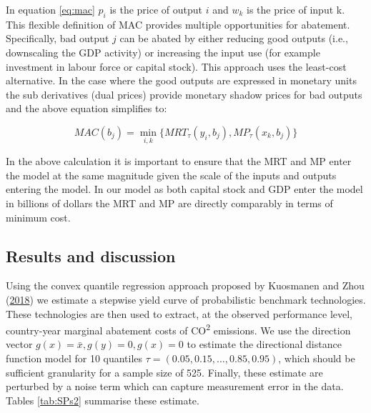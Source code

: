 \documentclass[12pt,]{article}
\begin{document}
In equation \eqref{eq:mac} \(p_{i}\) is the price of output \(i\) and \(w_{k}\) is the price of input k. This flexible definition of MAC provides multiple opportunities for abatement. Specifically, bad output \(j\) can be abated by either reducing good outputs (i.e., downscaling the GDP activity) or increasing the input use (for example investment in labour force or capital stock). This approach uses the least-cost alternative. In the case where the good outputs are expressed in monetary units the sub derivatives (dual prices) provide monetary shadow prices for bad outputs and the above equation simplifies to:

\begin{equation}
MAC(b_{j})=\displaystyle \min_{i,k}\{MRT_{\tau}(y_{i},b_{j}), MP_{\tau}(x_{k},b_{j})\} 
\label{eq:mac1}
\end{equation}

In the above calculation it is important to ensure that the MRT and MP enter the model at the same magnitude given the scale of the inputs and outputs entering the model. In our model as both capital stock and GDP enter the model in billions of dollars the MRT and MP are directly comparably in terms of minimum cost.

\hypertarget{results-and-discussion}{%
\subsection{Results and discussion}\label{results-and-discussion}}

Using the convex quantile regression approach proposed by Kuosmanen and Zhou (\protect\hyperlink{ref-Kuosmanen2018b}{2018}) we estimate a stepwise yield curve of probabilistic benchmark technologies. These technologies are then used to extract, at the observed performance level, country-year marginal abatement costs of CO\textsuperscript{2} emissions. We use the direction vector \(g(x)=\bar{x}, g(y)=0, g(x)=0\) to estimate the directional distance function model for 10 quantiles \(\tau=(0.05,0.15,\dots,0.85,0.95)\), which should be sufficient granularity for a sample size of 525. Finally, these estimate are perturbed by a noise term which can capture measurement error in the data. Tables \ref{tab:SPs2} summarise these estimate.
\end{document}
